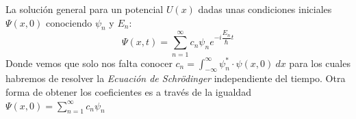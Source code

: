 \documentclass{report}
\begin{document}
{          \noindent La solución general para un potencial $U(x)$ dadas unas condiciones
          iniciales $\Psi(x,0)$ conociendo $\psi_n$ y $E_n$:
          \[\Psi(x,t)=\sum_{n=1}^{\infty}c_n\psi_n e^{-i\dfrac{E_n}{\hbar}t}\]
          Donde vemos que solo nos falta conocer $c_n=\int_{-\infty}^{\infty}
          \psi_n^*\cdot\psi(x,0)\ dx$ para los cuales habremos de resolver la
          \textit{Ecuación de Schrödinger} independiente del tiempo. Otra forma
          de obtener los coeficientes es a través de la igualdad $\displaystyle
          \Psi(x,0)=\sum_{n=1}^{\infty}c_n\psi_n$

        }
\end{document}
